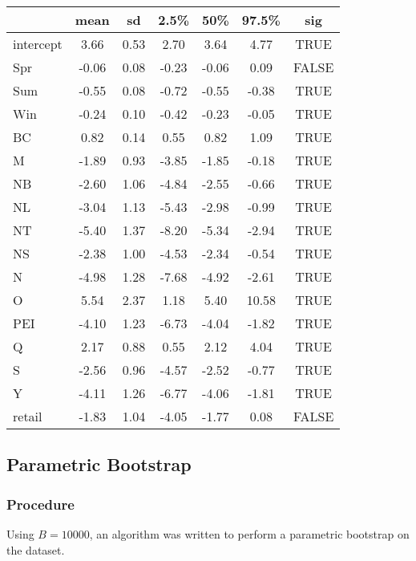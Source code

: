 \documentclass[12pt]{article}
\begin{document}
\begin{table}[hbt!]
  \centering
  \begin{tabular}{|l|c|c|c|c|c|c|}
    \hline
              & mean  & sd   & 2.5\% & 50\%  & 97.5\% & sig   \\
    \hline
    intercept & 3.66  & 0.53 & 2.70  & 3.64  & 4.77   & TRUE  \\
    Spr       & -0.06 & 0.08 & -0.23 & -0.06 & 0.09   & FALSE \\
    Sum       & -0.55 & 0.08 & -0.72 & -0.55 & -0.38  & TRUE  \\
    Win       & -0.24 & 0.10 & -0.42 & -0.23 & -0.05  & TRUE  \\
    BC        & 0.82  & 0.14 & 0.55  & 0.82  & 1.09   & TRUE  \\
    M         & -1.89 & 0.93 & -3.85 & -1.85 & -0.18  & TRUE  \\
    NB        & -2.60 & 1.06 & -4.84 & -2.55 & -0.66  & TRUE  \\
    NL        & -3.04 & 1.13 & -5.43 & -2.98 & -0.99  & TRUE  \\
    NT        & -5.40 & 1.37 & -8.20 & -5.34 & -2.94  & TRUE  \\
    NS        & -2.38 & 1.00 & -4.53 & -2.34 & -0.54  & TRUE  \\
    N         & -4.98 & 1.28 & -7.68 & -4.92 & -2.61  & TRUE  \\
    O         & 5.54  & 2.37 & 1.18  & 5.40  & 10.58  & TRUE  \\
    PEI       & -4.10 & 1.23 & -6.73 & -4.04 & -1.82  & TRUE  \\
    Q         & 2.17  & 0.88 & 0.55  & 2.12  & 4.04   & TRUE  \\
    S         & -2.56 & 0.96 & -4.57 & -2.52 & -0.77  & TRUE  \\
    Y         & -4.11 & 1.26 & -6.77 & -4.06 & -1.81  & TRUE  \\
    retail    & -1.83 & 1.04 & -4.05 & -1.77 & 0.08   & FALSE \\
    \hline
  \end{tabular}
\end{table}
\newpage
\subsection{Parametric Bootstrap}
\subsubsection*{Procedure}
Using $B = 10000$, an algorithm was written to perform a parametric bootstrap on the dataset.
\end{document}
